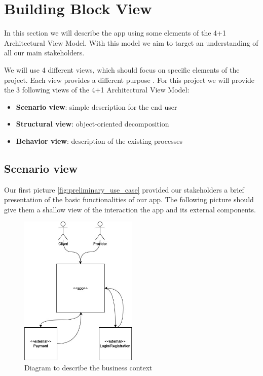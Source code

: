 \section{Building Block View}

In this section we will describe the \gls{app} using some elements of the 4+1 Architectural View Model. With this model we
aim to target an understanding of all our main stakeholders.

We will use 4 different views, which should focus on specific elements of the project. Each view provides a different
purpose \cite{refart:KR41}. For this project we will provide the 3 following views of the 4+1 Architectural View 
Model:

\begin{itemize}
    \item \textbf{Scenario view}: simple description for the end user 
    \item \textbf{Structural view}: object-oriented decomposition
    \item \textbf{Behavior view}: description of the existing processes
\end{itemize}

\subsection{Scenario view}

Our first picture \ref{fig:preliminary_use_case} provided our stakeholders a brief presentation of the basic functionalities
of our app. The following picture should give them a shallow view of the interaction the app and its external components.

\begin{figure}[H]
    \centering
    \includegraphics[width=0.5\textwidth]{assets/business_context.jpg}
    \caption{Diagram to describe the business context}
    \label{fig:business_context}
\end{figure}

